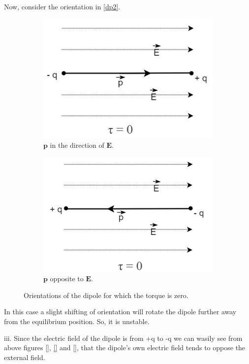 Now, consider the orientation in \ref{dp2}. \\
\begin{figure}[h]
    \centering
    \begin{subfigure}[b]{0.45\textwidth}
    \centering
    \includegraphics[scale = 0.6]{figures/Sandesh's Figures/dipoles1.png}
     \caption{$\bm{p}$ in the direction of $\bm{E}$.}
     \label{dp}
    \end{subfigure}
    \hfill
     \begin{subfigure}[b]{0.45\textwidth}
     \centering
    \includegraphics[scale = 0.6]{figures/Sandesh's Figures/dipoles2.png}
     \caption{$\bm{p}$ opposite to $\bm{E}$.}
     \label{dp}
    \end{subfigure}
     \caption{Orientations of the dipole for which the torque is zero.}
    \label{dipoles}
\end{figure}
In this case a slight shifting of orientation will rotate the dipole further away from the equilibrium position. So, it is unstable.

iii. Since the electric field of the dipole is from +q to -q we can wasily see from above figures \ref{}, \ref{} and \ref{}, that the dipole's own electric field tends to oppose the external field.



